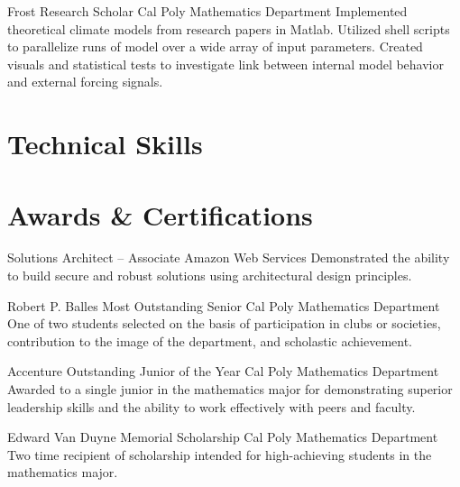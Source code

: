\documentclass[letterpaper, 11pt, sans]{moderncv}
\begin{document}
        {Frost Research Scholar}
        {Cal Poly Mathematics Department}{}{}
        {
            Implemented theoretical climate models from research papers in Matlab.\newline
            Utilized shell scripts to parallelize runs of model over a wide array of input parameters.\newline
            Created visuals and statistical tests to investigate link between internal model behavior and external forcing signals.\newline 
        }


\newpage
\section{Technical Skills}


\section{Awards \& Certifications}
        {Solutions Architect -- Associate}
        {Amazon Web Services}{}{}
        {Demonstrated the ability to build secure and robust solutions using architectural design principles.\newline}

        {Robert P. Balles Most Outstanding Senior}
        {Cal Poly Mathematics Department}{}{}
        {One of two students selected on the basis of participation in clubs or societies, contribution to the image of the department, and scholastic achievement.\newline}

        {Accenture Outstanding Junior of the Year}
        {Cal Poly Mathematics Department}{}{}
        {Awarded to a single junior in the mathematics major for demonstrating superior leadership skills and the ability to work effectively with peers and faculty.\newline}

        {Edward Van Duyne Memorial Scholarship}
        {Cal Poly Mathematics Department}{}{}
        {Two time recipient of scholarship intended for high-achieving students in the mathematics major.\newline}
\end{document}
